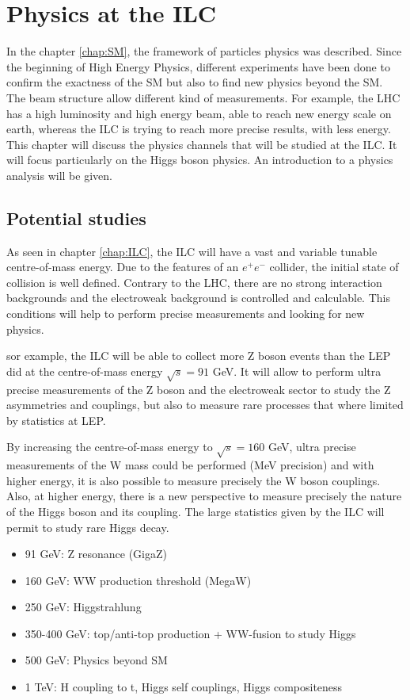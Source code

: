 \chapter{Physics at the ILC}

  In the chapter \ref{chap:SM}, the framework of particles physics was described. 
  Since the beginning of High Energy Physics, different experiments have been done to confirm the exactness of the SM but also to find new physics beyond the SM.
  The beam structure allow different kind of measurements.
  For example, the LHC has a high luminosity and high energy beam, able to reach new energy scale on earth, whereas the ILC is trying to reach more precise results, with less energy.
  This chapter will discuss the physics channels that will be studied at the ILC.
  It will focus particularly on the Higgs boson physics.
  An introduction to a physics analysis will be given. 
 
 \minitoc

  \section{Potential studies}

  As seen in chapter \ref{chap:ILC}, the ILC will have a vast and variable tunable centre-of-mass energy.
  Due to the features of an $e^+e^-$ collider, the initial state of collision is well defined.
  Contrary to the LHC, there are no strong interaction backgrounds and the electroweak background is controlled and calculable.
  This conditions will help to perform precise measurements and looking for new physics. 
  
  sor example, the ILC will be able to collect more Z boson events than the LEP did at the centre-of-mass energy $\sqrt{s} = 91$ GeV.
  It will allow to perform ultra precise measurements of the Z boson and the electroweak sector to study the Z asymmetries and couplings, but also to measure rare processes that where limited by statistics at LEP.
  
  By increasing the centre-of-mass energy to $\sqrt{s} = 160$ GeV, ultra precise measurements of the W mass could be performed (MeV precision) and with higher energy, it is also possible to measure precisely the W boson couplings.
  Also, at higher energy, there is a new perspective to measure precisely the nature of the Higgs boson and its coupling.
  The large statistics given by the ILC will permit to study rare Higgs decay.

  \begin{itemize}
    \item 91 GeV: Z resonance  (GigaZ)
    \item 160 GeV: WW production threshold (MegaW)
    \item 250 GeV: Higgstrahlung
    \item 350-400 GeV: top/anti-top production + WW-fusion to study Higgs
    \item 500 GeV: Physics beyond SM
    \item 1 TeV: H coupling to t, Higgs self couplings, Higgs compositeness 
  \end{itemize}

